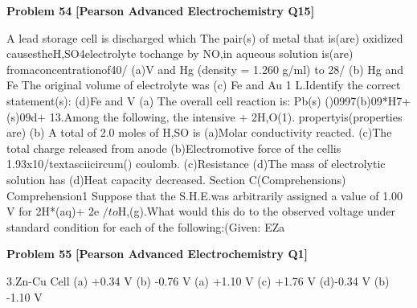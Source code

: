 \begin{problembox}
\textbf{Problem 54} \hfill \textbf{[Pearson Advanced Electrochemistry Q15]}
\label{q:ext-pearson-54}

A lead storage cell is discharged which
The pair(s) of metal that is(are) oxidized
causestheH,SO4electrolyte tochange
by NO,in aqueous solution is(are)
fromaconcentrationof40/%
(a)V and Hg
(density = 1.260 g/ml) to 28/%
(b) Hg and Fe
The original volume of electrolyte was
(c) Fe and Au
1 L.Identify the correct statement(s):
(d)Fe and V
(a) The overall cell reaction is: Pb(s)
()0997(b)09*H7+(s)09d+
13.Among the following, the intensive
+ 2H,O(1).
propertyis(properties are)
(b) A total of 2.0 moles of H,SO is
(a)Molar conductivity
reacted.
(c)The total charge released from anode
(b)Electromotive force
of the cellis 1.93x10/textasciicircum() coulomb.
(c)Resistance
(d)The mass of electrolytic solution has
(d)Heat capacity
decreased.
Section C(Comprehensions)
Comprehension1
Suppose that the S.H.E.was arbitrarily assigned a value of 1.00 V for 2H*(aq)+ 2e $/to$H,(g).What
would this do to the observed voltage under standard condition for each of the following:(Given:
EZa
\end{problembox}

\begin{problembox}
\textbf{Problem 55} \hfill \textbf{[Pearson Advanced Electrochemistry Q1]}
\label{q:ext-pearson-55}

3.Zn-Cu Cell
(a) +0.34 V
(b) -0.76 V
(a) +1.10 V
(c) +1.76 V
(d)-0.34 V
(b) -1.10 V
\end{problembox}

